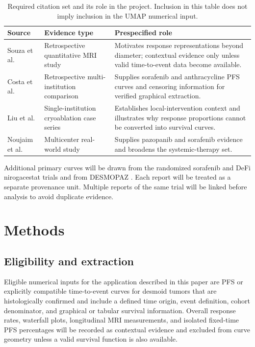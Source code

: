 \documentclass[17pt]{extarticle}
\begin{document}
\begin{table}[ht]
\centering
\caption{Required citation set and its role in the project. Inclusion in this table does not imply inclusion in the UMAP numerical input.}
\begin{tabularx}{\textwidth}{>{\raggedright\arraybackslash}p{2.5cm}>{\raggedright\arraybackslash}p{3.7cm}X}
\toprule
Source & Evidence type & Prespecified role \\
\midrule
Souza et al. \citep{souza2023t2} & Retrospective quantitative MRI study & Motivates response representations beyond diameter; contextual evidence only unless valid time-to-event data become available. \\
Costa et al. \citep{costa2025sorafenib} & Retrospective multi-institution comparison & Supplies sorafenib and anthracycline PFS curves and censoring information for verified graphical extraction. \\
Liu et al. \citep{liu2022cryo} & Single-institution cryoablation case series & Establishes local-intervention context and illustrates why response proportions cannot be converted into survival curves. \\
Noujaim et al. \citep{noujaim2024realworld} & Multicenter real-world study & Supplies pazopanib and sorafenib evidence and broadens the systemic-therapy set. \\
\bottomrule
\end{tabularx}
\end{table}


Additional primary curves will be drawn from the randomized sorafenib and DeFi nirogacestat trials and from DESMOPAZ \citep{gounder2018sorafenib,gounder2023nirogacestat,toulmonde2019desmopaz}. Each report will be treated as a separate provenance unit. Multiple reports of the same trial will be linked before analysis to avoid duplicate evidence.


\section{Methods}


\subsection{Eligibility and extraction}

Eligible numerical inputs for the application described in this paper are PFS or explicitly compatible time-to-event curves for desmoid tumors that are histologically confirmed and include a defined time origin, event definition, cohort denominator, and graphical or tabular survival information. Overall response rates, waterfall plots, longitudinal MRI measurements, and isolated fixed-time PFS percentages will be recorded as contextual evidence and excluded from curve geometry unless a valid survival function is also available.
\end{document}
